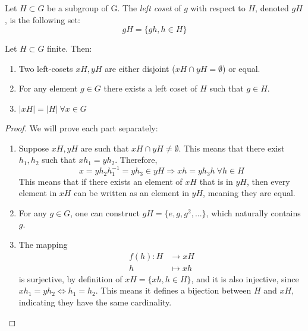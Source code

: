 \begin{definition}
  Let $H\subset G$ be a subgroup of G. The \emph{left coset} of $g$ with respect to $H$, denoted $gH$, is the following set: 
  \[
    gH = \{gh, h \in H\}
  \]
\end{definition}

\begin{theorem}
  Let $H \subset G$ finite. Then: 
  \begin{enumerate}
    \item Two left-cosets $xH, yH$ are either disjoint ($xH \cap yH = \emptyset$) or equal. 
    \item For any element $g \in G$ there exists a left coset of $H$ such that $g \in H$.
    \item $|xH| = |H| \ \forall x \in G$
  \end{enumerate}
\end{theorem}
\begin{proof}
  We will prove each part separately: 
  \begin{enumerate}
    \item Suppose $xH, yH$ are such that $xH \cap yH \neq \emptyset$. This means that there exist $h_1, h_2$ such that $xh_1 = yh_2$. Therefore, 
    \[
      x = yh_2h_1^{-1} = yh_3 \in yH \Rightarrow xh = yh_3h \ \forall h \in H
    \]
    This means that if there exists an element of $xH$ that is in $yH$, then every element in $xH$ can be written as an element in $yH$, meaning they are equal.
    \item For any $g \in G$, one can construct $gH = \{e, g, g^2, ...\}$, which naturally contains $g$. 
    \item The mapping 
    \begin{align*}
      f(h): H     &\to xH \\
            h &\mapsto xh
    \end{align*}
    is surjective, by definition of $xH = \{xh, h \in H\}$, and it is also injective, since $xh_1 = yh_2 \Leftrightarrow h_1 = h_2$. This means it defines a bijection between $H$ and $xH$, indicating they have the same cardinality.
  \end{enumerate}
\end{proof}

